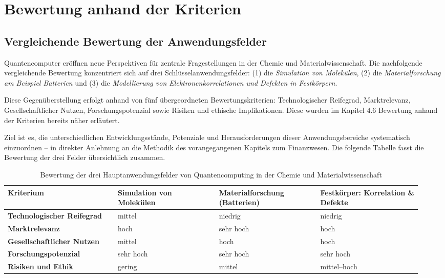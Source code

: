 \section{Bewertung anhand der Kriterien}

\subsection{Vergleichende Bewertung der Anwendungsfelder}

Quantencomputer eröffnen neue Perspektiven für zentrale Fragestellungen in der Chemie und Materialwissenschaft. Die nachfolgende vergleichende Bewertung konzentriert sich auf drei Schlüsselanwendungsfelder: (1) die \textit{Simulation von Molekülen}, (2) die \textit{Materialforschung am Beispiel Batterien} und (3) die \textit{Modellierung von Elektronenkorrelationen und Defekten in Festkörpern}.

Diese Gegenüberstellung erfolgt anhand von fünf übergeordneten Bewertungskriterien: Technologischer Reifegrad, Marktrelevanz, Gesellschaftlicher Nutzen, Forschungspotenzial sowie Risiken und ethische Implikationen. Diese wurden im Kapitel 4.6 Bewertung anhand der Kriterien bereits näher erläutert.

Ziel ist es, die unterschiedlichen Entwicklungsstände, Potenziale und Herausforderungen dieser Anwendungsbereiche systematisch einzuordnen – in direkter Anlehnung an die Methodik des vorangegangenen Kapitels zum Finanzwesen. Die folgende Tabelle fasst die Bewertung der drei Felder übersichtlich zusammen.

\begin{table}[h]
\centering
\begin{tabular}{|p{0.25\linewidth}|p{0.23\linewidth}|p{0.23\linewidth}|p{0.23\linewidth}|}
\hline
\textbf{Kriterium} & \textbf{Simulation von Molekülen} & \textbf{Materialforschung (Batterien)} & \textbf{Festkörper: Korrelation \& Defekte} \\
\hline
\textbf{Techno\-logischer Reife\-grad} & mittel & niedrig & niedrig \\
\hline
\textbf{Markt\-relevanz} & hoch & sehr hoch & hoch \\
\hline
\textbf{Gesell\-schaft\-licher Nutzen} & mittel & hoch & hoch \\
\hline
\textbf{Forschungs\-potenzial} & sehr hoch & sehr hoch & sehr hoch \\
\hline
\textbf{Risiken und Ethik} & gering & mittel & mittel--hoch \\
\hline
\end{tabular}
\caption{Bewertung der drei Hauptanwendungsfelder von Quantencomputing in der Chemie und Materialwissenschaft}
\label{tab:qc-chemie-bewertung}
\end{table}



